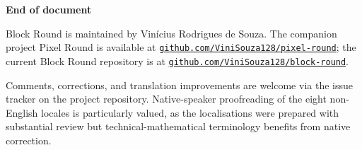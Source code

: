 \documentclass[12pt,a4paper]{scrartcl}
\newcommand{\biblink}[2]{\href{#1}{\nolinkurl{#2}}}
\begin{document}
\vspace{1.2em}

\begin{center}
{\sffamily\bfseries\color{accent}End of document}
\end{center}

\vspace{0.6em}

Block Round is maintained by Vinícius Rodrigues de Souza. The companion project Pixel Round is available at \biblink{https://github.com/ViniSouza128/pixel-round}{github.com/ViniSouza128/pixel-round}; the current Block Round repository is at \biblink{https://github.com/ViniSouza128/block-round}{github.com/ViniSouza128/block-round}.

Comments, corrections, and translation improvements are welcome via the issue tracker on the project repository. Native-speaker proofreading of the eight non-English locales is particularly valued, as the localisations were prepared with substantial review but technical-mathematical terminology benefits from native correction.
\end{document}
